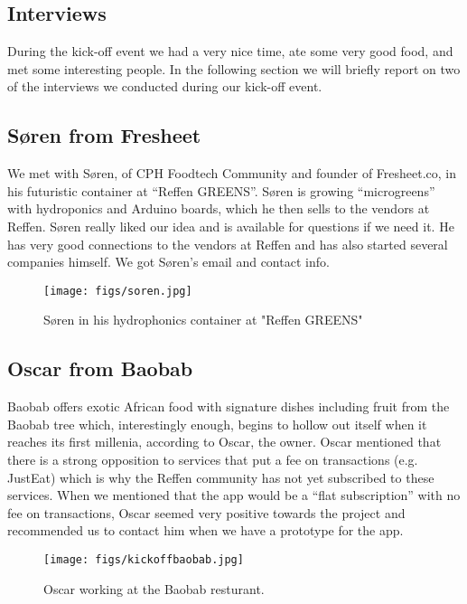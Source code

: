 \subsection{Interviews}
During the kick-off event we had a very nice time, ate some very good food, and met some interesting people. In the following section we will briefly report on two of the interviews we conducted during our kick-off event.

\subsection{Søren from Fresheet}
We met with Søren, of CPH Foodtech Community and founder of Fresheet.co, in his futuristic container at “Reffen GREENS”. Søren is growing “microgreens” with hydroponics and Arduino boards, which he then sells to the vendors at Reffen. Søren really liked our idea and is available for questions if we need it. He has very good connections to the vendors at Reffen and has also started several companies himself. We got Søren's email and contact info.

\begin{figure}[h]
  \centering
  \texttt{[image: figs/soren.jpg]}
  \caption{Søren in his hydrophonics container at "Reffen GREENS"}
  \label{kick-offsoeren}
\end{figure}


\subsection{Oscar from Baobab}
Baobab offers exotic African food with signature dishes including fruit from the Baobab tree which, interestingly enough, begins to hollow out itself when it reaches its first millenia, according to Oscar, the owner. Oscar mentioned that there is a strong opposition to services that put a fee on transactions (e.g. JustEat) which is why the Reffen community has not yet subscribed to these services. When we mentioned that the app would be a “flat subscription” with no fee on transactions, Oscar seemed very positive towards the project and recommended us to contact him when we have a prototype for the app.

\begin{figure}[h]
  \centering
  \texttt{[image: figs/kickoffbaobab.jpg]}
  \caption{Oscar working at the Baobab resturant.}
  \label{kick-offbaobab}
\end{figure}

